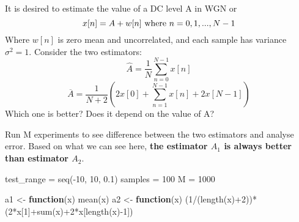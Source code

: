 \documentclass[
]{article}
\newenvironment{Shaded}{\begin{snugshade}}{\end{snugshade}}
\newcommand{\ControlFlowTok}[1]{\textcolor[rgb]{0.13,0.29,0.53}{\textbf{#1}}}
\newcommand{\DecValTok}[1]{\textcolor[rgb]{0.00,0.00,0.81}{#1}}
\newcommand{\FloatTok}[1]{\textcolor[rgb]{0.00,0.00,0.81}{#1}}
\newcommand{\FunctionTok}[1]{\textcolor[rgb]{0.00,0.00,0.00}{#1}}
\newcommand{\NormalTok}[1]{#1}
\newcommand{\OtherTok}[1]{\textcolor[rgb]{0.56,0.35,0.01}{#1}}
\newcommand{\SpecialCharTok}[1]{\textcolor[rgb]{0.00,0.00,0.00}{#1}}
\begin{document}
It is desired to estimate the value of a DC level A in WGN or
\[x[n]=A+w[n]$ where $n=0,1,...,N-1\] Where \(w[n]\) is zero mean and
uncorrelated, and each sample has variance \(\sigma^2=1\). Consider the
two estimators: \[\hat A = \dfrac{1}{N}\sum^{N-1}_{n=0}{x[n]}\]
\[\overline A=\dfrac{1}{N+2}\left(2x[0]+\sum^{N-1}_{n=1}{x[n]+2x[N-1]}\right)\]
Which one is better? Does it depend on the value of A?

Run M experiments to see difference between the two estimators and
analyse error. Based on what we can see here, \textbf{the estimator
\(A_1\) is always better than estimator \(A_2\)}.

\begin{Shaded}
\begin{Highlighting}[]
\NormalTok{test\_range }\OtherTok{=} \FunctionTok{seq}\NormalTok{(}\SpecialCharTok{{-}}\DecValTok{10}\NormalTok{, }\DecValTok{10}\NormalTok{, }\FloatTok{0.1}\NormalTok{)}
\NormalTok{samples }\OtherTok{=} \DecValTok{100}
\NormalTok{M }\OtherTok{=} \DecValTok{1000}

\NormalTok{a1 }\OtherTok{\textless{}{-}} \ControlFlowTok{function}\NormalTok{(x) }\FunctionTok{mean}\NormalTok{(x)}
\NormalTok{a2 }\OtherTok{\textless{}{-}} \ControlFlowTok{function}\NormalTok{(x) (}\DecValTok{1}\SpecialCharTok{/}\NormalTok{(}\FunctionTok{length}\NormalTok{(x)}\SpecialCharTok{+}\DecValTok{2}\NormalTok{))}\SpecialCharTok{*}\NormalTok{(}\DecValTok{2}\SpecialCharTok{*}\NormalTok{x[}\DecValTok{1}\NormalTok{]}\SpecialCharTok{+}\FunctionTok{sum}\NormalTok{(x)}\SpecialCharTok{+}\DecValTok{2}\SpecialCharTok{*}\NormalTok{x[}\FunctionTok{length}\NormalTok{(x)}\SpecialCharTok{{-}}\DecValTok{1}\NormalTok{])}


\end{Highlighting}
\end{Shaded}
\end{document}
